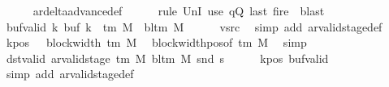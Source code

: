 \begin{isabellebody}
\ \ \ \ \isamarkupfalse%
\ ar{\isacharunderscore}{\kern0pt}delta{\isacharunderscore}{\kern0pt}advance{\isacharunderscore}{\kern0pt}def\isanewline
\ \ \ \ \isamarkupfalse%
\ {\isacharparenleft}{\kern0pt}rule\ UnI{}{\isacharparenright}{\kern0pt}\ {\isacharparenleft}{\kern0pt}use\ qQ\ last\ fire{\isacharprime}{\kern0pt}\ \ blast{\isacharparenright}{\kern0pt}\isanewline
\ \ \isamarkupfalse%
\ buf{\isacharunderscore}{\kern0pt}valid{\isacharcolon}{\kern0pt}\ {\isachardoublequoteopen}{\isasymforall}k{\isachardot}{\kern0pt}\ buf\ k\ {\isasymin}\ {\isasymGamma}{\isacharunderscore}{\kern0pt}tm\ M\ {\isasymunion}\ {\isacharbraceleft}{\kern0pt}bl{\isacharunderscore}{\kern0pt}tm\ M{\isacharbraceright}{\kern0pt}{\isachardoublequoteclose}\isanewline
\ \ \ \ \isamarkupfalse%
\ vsrc\ \isamarkupfalse%
\ {\isacharparenleft}{\kern0pt}simp\ add{\isacharcolon}{\kern0pt}\ ar{\isacharunderscore}{\kern0pt}valid{\isacharunderscore}{\kern0pt}stage{\isacharunderscore}{\kern0pt}def{\isacharparenright}{\kern0pt}\isanewline
\ \ \isamarkupfalse%
\ kpos{\isacharcolon}{\kern0pt}\ {\isachardoublequoteopen}{}\ {\isacharless}{\kern0pt}\ block{\isacharunderscore}{\kern0pt}width\ {\isacharparenleft}{\kern0pt}{\isasymGamma}{\isacharunderscore}{\kern0pt}tm\ M{\isacharparenright}{\kern0pt}{\isachardoublequoteclose}\ \isamarkupfalse%
\ block{\isacharunderscore}{\kern0pt}width{\isacharunderscore}{\kern0pt}pos{\isacharbrackleft}{\kern0pt}of\ {\isachardoublequoteopen}{\isasymGamma}{\isacharunderscore}{\kern0pt}tm\ M{\isachardoublequoteclose}{\isacharbrackright}{\kern0pt}\ \isamarkupfalse%
\ simp\isanewline
\ \ \isamarkupfalse%
\ dst{\isacharunderscore}{\kern0pt}valid{\isacharcolon}{\kern0pt}\ {\isachardoublequoteopen}ar{\isacharunderscore}{\kern0pt}valid{\isacharunderscore}{\kern0pt}stage\ {\isacharparenleft}{\kern0pt}{\isasymGamma}{\isacharunderscore}{\kern0pt}tm\ M{\isacharparenright}{\kern0pt}\ {\isacharparenleft}{\kern0pt}bl{\isacharunderscore}{\kern0pt}tm\ M{\isacharparenright}{\kern0pt}\ {\isacharparenleft}{\kern0pt}snd\ {\isacharquery}{\kern0pt}s{\isacharprime}{\kern0pt}{\isacharparenright}{\kern0pt}{\isachardoublequoteclose}\isanewline
\ \ \ \ \isamarkupfalse%
\ kpos\ buf{\isacharunderscore}{\kern0pt}valid\ \isamarkupfalse%
\ {\isacharparenleft}{\kern0pt}simp\ add{\isacharcolon}{\kern0pt}\ ar{\isacharunderscore}{\kern0pt}valid{\isacharunderscore}{\kern0pt}stage{\isacharunderscore}{\kern0pt}def{\isacharparenright}{\kern0pt}\isanewline

\end{isabellebody}
